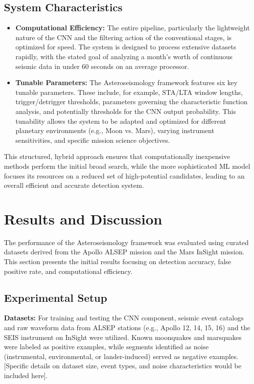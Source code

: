 \documentclass[conference]{IEEEtran}
\begin{document}
\subsection{System Characteristics}
\begin{itemize}
    \item \textbf{Computational Efficiency:} The entire pipeline, particularly the lightweight nature of the CNN and the filtering action of the conventional stages, is optimized for speed. The system is designed to process extensive datasets rapidly, with the stated goal of analyzing a month's worth of continuous seismic data in under 60 seconds on an average processor.
    \item \textbf{Tunable Parameters:} The Asteroseismology framework features six key tunable parameters. These include, for example, STA/LTA window lengths, trigger/detrigger thresholds, parameters governing the characteristic function analysis, and potentially thresholds for the CNN output probability. This tunability allows the system to be adapted and optimized for different planetary environments (e.g., Moon vs. Mars), varying instrument sensitivities, and specific mission science objectives.
\end{itemize}

This structured, hybrid approach ensures that computationally inexpensive methods perform the initial broad search, while the more sophisticated ML model focuses its resources on a reduced set of high-potential candidates, leading to an overall efficient and accurate detection system.

\section{Results and Discussion}
\label{sec:results_discussion}
The performance of the Asteroseismology framework was evaluated using curated datasets derived from the Apollo ALSEP mission and the Mars InSight mission. This section presents the initial results focusing on detection accuracy, false positive rate, and computational efficiency.

\subsection{Experimental Setup}
\textbf{Datasets:} For training and testing the CNN component, seismic event catalogs and raw waveform data from ALSEP stations (e.g., Apollo 12, 14, 15, 16) and the SEIS instrument on InSight were utilized. Known moonquakes and marsquakes were labeled as positive examples, while segments identified as noise (instrumental, environmental, or lander-induced) served as negative examples. [Specific details on dataset size, event types, and noise characteristics would be included here].
\end{document}
